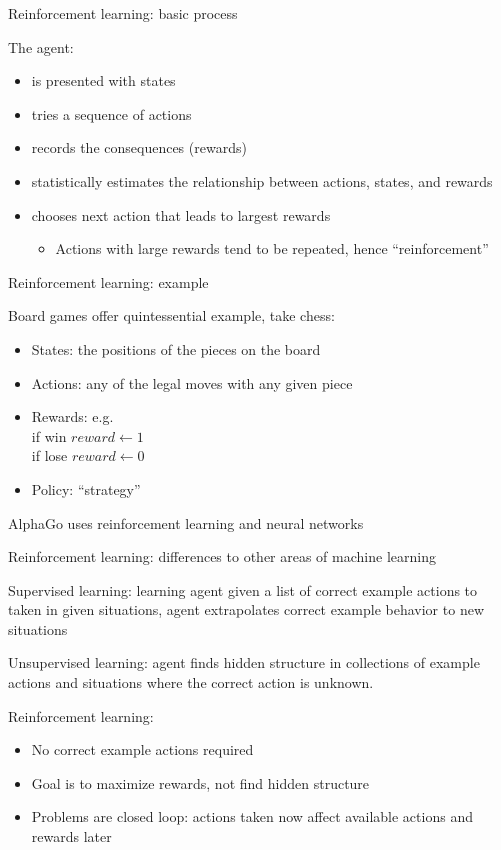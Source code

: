\documentclass[10pt]{beamer}
\begin{document}
\begin{frame}[c]{Reinforcement learning: basic process}

The agent:
\begin{itemize}[<+->]
  \item is presented with states
  \item tries a sequence of actions
  \item records the consequences (rewards)
  \item statistically estimates the relationship between actions, states, and rewards
  \item chooses next action that leads to largest rewards
  \begin{itemize}
    \item Actions with large rewards tend to be repeated, hence ``reinforcement''
  \end{itemize}
\end{itemize}
\end{frame}

\begin{frame}[c]{Reinforcement learning: example}

Board games offer quintessential example, take chess:
\begin{itemize}
    \item States: the positions of the pieces on the board
    \item Actions: any of the legal moves with any given piece
    \item Rewards: e.g. \\
    if win $reward \gets 1$ \\
    if lose $reward \gets 0$
    \item Policy: ``strategy''
\end{itemize}

AlphaGo uses reinforcement learning and neural networks

\end{frame}

\begin{frame}[t]{Reinforcement learning: differences to other areas of machine learning}
  
Supervised learning: learning agent given a list of correct example actions to taken in given situations, agent extrapolates correct example behavior to new situations

Unsupervised learning: agent finds hidden structure in collections of example actions and situations where the correct action is unknown.

Reinforcement learning: 
\begin{itemize}
  \item No correct example actions required
  \item Goal is to maximize rewards, not find hidden structure
  \item Problems are closed loop: actions taken now affect available actions and rewards later
\end{itemize}
  
\end{frame}
\end{document}
